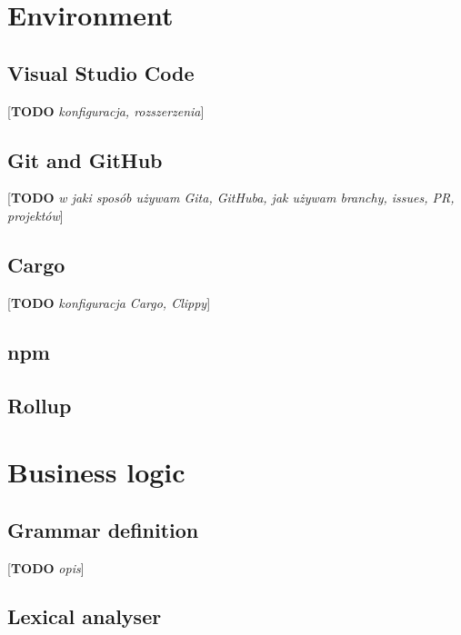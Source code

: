 \documentclass[english,engineering]{wizthesis}
\newcommand{\todo}[1]{{\color{red}[\textbf{TODO} \textit{#1}]}}
\begin{document}
\section{Environment}

\subsection{Visual Studio Code}

\todo{konfiguracja, rozszerzenia}

\subsection{Git and GitHub}

\todo{w jaki sposób używam Gita, GitHuba, jak używam branchy, issues, PR,
projektów}

\subsection{Cargo}

\todo{konfiguracja Cargo, Clippy}

\subsection{npm}

\subsection{Rollup}

\section{Business logic}

\subsection{Grammar definition}


\todo{opis}

\subsection{Lexical analyser}
\end{document}
